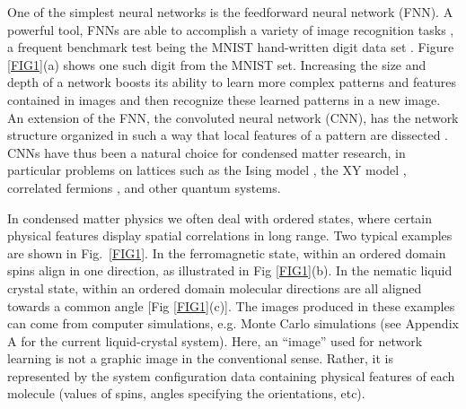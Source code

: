 One of the simplest neural networks is the feedforward neural network (FNN). A powerful tool, FNNs are able to accomplish a variety of image recognition tasks \cite{schmidhuber_deep}, a frequent benchmark test being the MNIST hand-written digit data set \cite{mnistset}. Figure \ref{FIG1}(a) shows one such digit from the MNIST set. Increasing the size and depth of a network boosts its ability to learn more complex patterns and features contained in images and then recognize these learned patterns in a new image.
An extension of the FNN, the convoluted neural network (CNN), has the network structure organized in such a way that local features of a pattern are dissected \cite{cnnmnist}.
CNNs have thus been a natural choice for condensed matter research, in particular problems on lattices such as the Ising model \cite{carras}, the XY model \cite{beach}, correlated fermions \cite{broecker,chng}, and other quantum systems.

In condensed matter physics we often deal with ordered states, where
certain physical features display spatial correlations in long range. Two typical examples are shown in Fig.\ \ref{FIG1}. In the ferromagnetic state, within an ordered domain spins align in one direction, as illustrated in Fig \ref{FIG1}(b). In the nematic liquid crystal state, within an ordered domain molecular directions are all aligned towards a common angle [Fig \ref{FIG1}(c)].
The images produced in these examples can come from computer simulations, e.g. Monte Carlo simulations (see Appendix A for the current liquid-crystal system).
Here, an ``image'' used for network learning is not a graphic image in the conventional sense. Rather, it is represented by the system configuration data containing physical features of each molecule (values of spins, angles specifying the orientations, etc).

